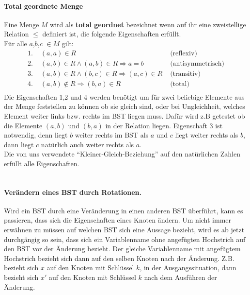 \documentclass[a4paper,12pt]{article}
\begin{document}
\paragraph{Total geordnete Menge} 
Eine Menge $M$ wird als \textbf{total geordnet} bezeichnet wenn auf ihr eine zweistellige Relation $\leq$ definiert ist, die folgende Eigenschaften erfüllt.\\
Für alle $a$,$b$,$c$ $\in M$ gilt:
\begin{align*}
\text{1. } & (a,a) \in R  &\text{  (reflexiv)}\\
\text{2. } & (a,b) \in R  \land  (a,b) \in R \Rightarrow a = b  &\text{  (antisymmetrisch)}\\
\text{3. } & (a,b) \in R  \land  (b,c) \in R \Rightarrow  (a,c) \in R  &\text{  (transitiv)}\\
\text{4. } & (a,b) \notin R \Rightarrow  (b,a) \in R   &\text{  (total)}\\
\end{align*}
Die Eigenschaften 1,2 und 4 werden benötigt um für zwei beliebige Elemente aus der Menge feststellen zu können ob sie gleich sind, oder bei Ungleichheit, welches Element weiter links bzw. rechts im BST liegen muss. Dafür wird z.B getestet ob die Elemente $(a,b)$ und $(b, a)$ in der Relation liegen. Eigenschaft 3 ist notwendig, denn liegt $b$ weiter rechts im BST als $a$ und $c$ liegt weiter rechts als $b$, dann liegt $c$ natürlich auch weiter rechts als $a$. \\
Die von uns verwendete \enquote{Kleiner-Gleich-Beziehung} auf den natürlichen Zahlen erfüllt alle Eigenschaften.
\\
\\




\paragraph{Verändern eines BST durch Rotationen.}
Wird ein BST durch eine Veränderung in einen anderen BST überführt, kann es passieren, dass sich die Eigenschaften eines Knoten ändern. Um nicht immer erwähnen zu müssen auf welchen BST sich eine Aussage bezieht, wird es ab jetzt durchgängig so sein, dass sich ein Variablenname ohne angefügten Hochstrich auf den BST vor der Änderung bezieht. Der gleiche Variablenname mit angefügtem Hochstrich bezieht sich dann auf den selben Knoten nach der Änderung. Z.B. bezieht sich $x$ auf den Knoten mit Schlüssel $k$, in der Ausgangssituation, dann bezieht sich $x'$ auf den Knoten mit Schlüssel $k$ nach dem Ausführen der Änderung. \\
\end{document}
